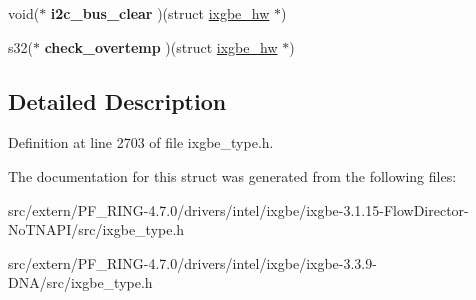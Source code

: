 \begin{DoxyCompactItemize}
\item 
\hypertarget{structixgbe__phy__operations_a41a98b325126ef512affce5d0851dd06}{
void($\ast$ {\bfseries i2c\_\-bus\_\-clear} )(struct \hyperlink{structixgbe__hw}{ixgbe\_\-hw} $\ast$)}
\label{structixgbe__phy__operations_a41a98b325126ef512affce5d0851dd06}

\item 
\hypertarget{structixgbe__phy__operations_ae898c0ff7a99b46265ad56a7d258faab}{
s32($\ast$ {\bfseries check\_\-overtemp} )(struct \hyperlink{structixgbe__hw}{ixgbe\_\-hw} $\ast$)}
\label{structixgbe__phy__operations_ae898c0ff7a99b46265ad56a7d258faab}

\end{DoxyCompactItemize}


\subsection{Detailed Description}


Definition at line 2703 of file ixgbe\_\-type.h.



The documentation for this struct was generated from the following files:\begin{DoxyCompactItemize}
\item 
src/extern/PF\_\-RING-\/4.7.0/drivers/intel/ixgbe/ixgbe-\/3.1.15-\/FlowDirector-\/NoTNAPI/src/ixgbe\_\-type.h\item 
src/extern/PF\_\-RING-\/4.7.0/drivers/intel/ixgbe/ixgbe-\/3.3.9-\/DNA/src/ixgbe\_\-type.h\end{DoxyCompactItemize}
